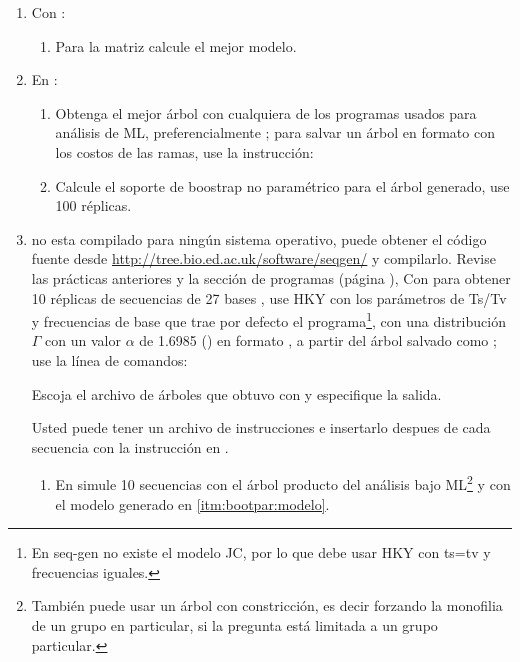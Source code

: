 \begin{enumerate}

  \item Con :
  \begin{enumerate}
    \item \label{itm:bootpar:modelo}Para la matriz  calcule el mejor modelo.
  \end{enumerate}
   
  \item En :
  \begin{enumerate}
    \item \label{itm:bootpar:arbol}Obtenga el mejor \'arbol con cualquiera de los programas usados para an\'alisis de ML, preferencialmente ; para salvar un \'arbol en formato  con los costos de las ramas, use la instrucci\'on: 

    \item Calcule el soporte de boostrap no param\'etrico para el \'arbol generado, use 100 r\'eplicas.
  \end{enumerate}
   
  \item \label{itm:bootpar:simul} no esta compilado para ning\'un sistema operativo, puede obtener el c\'odigo fuente desde \url{http://tree.bio.ed.ac.uk/software/seqgen/} y compilarlo. Revise las pr\'acticas anteriores y la secci\'on de programas (p\'agina \pageref{ch:programas}), Con  para obtener 10 r\'eplicas  de secuencias de 27 bases , use HKY  con los par\'ametros de Ts/Tv y frecuencias de base que trae por defecto el programa\footnote{En seq-gen no existe el modelo JC, por lo que debe usar HKY con ts=tv y frecuencias iguales.}, con una distribuci\'on $\Gamma$ con un valor $\alpha$ de 1.6985 () en formato , a partir del \'arbol salvado como ; use la l\'inea de comandos:

Escoja el archivo de \'arboles que obtuvo con  y especifique la salida.

Usted puede tener un archivo de instrucciones e insertarlo despues de cada secuencia con la instrucci\'on  en .

  \begin{enumerate}
    \item En  simule 10 secuencias con el \'arbol producto del an\'alisis bajo ML\footnote{Tambi\'en puede usar un \'arbol con constricci\'on, es decir forzando la monofilia de un grupo en particular, si la pregunta est\'a limitada a un grupo particular.} y con el modelo generado en \ref{itm:bootpar:modelo}.
  \end{enumerate}
   


\end{enumerate}
